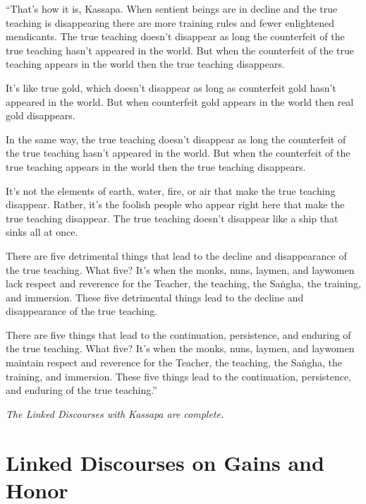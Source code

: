 \documentclass[12pt,openany]{book}%
\let\oldcontentsline\contentsline
\newcommand{\nopagecontentsline}[3]{\oldcontentsline{#1}{#2}{}}
\newcommand*{\scendsutta}[1]{\begin{center}\textit{#1}\end{center}}
\begin{document}
“That’s how it is, Kassapa. When sentient beings are in decline and the true teaching is disappearing there are more training rules and fewer enlightened mendicants. The true teaching doesn’t disappear as long the counterfeit of the true teaching hasn’t appeared in the world. But when the counterfeit of the true teaching appears in the world then the true teaching disappears. 

It’s like true gold, which doesn’t disappear as long as counterfeit gold hasn’t appeared in the world. But when counterfeit gold appears in the world then real gold disappears. 

In the same way, the true teaching doesn’t disappear as long the counterfeit of the true teaching hasn’t appeared in the world. But when the counterfeit of the true teaching appears in the world then the true teaching disappears. 

It’s not the elements of earth, water, fire, or air that make the true teaching disappear. Rather, it’s the foolish people who appear right here that make the true teaching disappear. The true teaching doesn’t disappear like a ship that sinks all at once. 

There are five detrimental things that lead to the decline and disappearance of the true teaching. What five? It’s when the monks, nuns, laymen, and laywomen lack respect and reverence for the Teacher, the teaching, the \textsanskrit{Saṅgha}, the training, and immersion. These five detrimental things lead to the decline and disappearance of the true teaching. 

There are five things that lead to the continuation, persistence, and enduring of the true teaching. What five? It’s when the monks, nuns, laymen, and laywomen maintain respect and reverence for the Teacher, the teaching, the \textsanskrit{Saṅgha}, the training, and immersion. These five things lead to the continuation, persistence, and enduring of the true teaching.” 

\scendsutta{The Linked Discourses with Kassapa are complete. }

%
\part*{Linked Discourses on Gains and Honor }
\markboth{}{}
\addtocontents{toc}{\let\protect\contentsline\protect\oldcontentsline}
\end{document}
